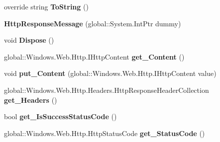 \begin{DoxyCompactItemize}
override string {\bfseries To\+String} ()
\item 
\mbox{\label{class_windows_1_1_web_1_1_http_1_1_http_response_message_abf9eacfb0122fbb37c4cefbe6027c1bb}} 
{\bfseries Http\+Response\+Message} (global\+::\+System.\+Int\+Ptr dummy)
\item 
\mbox{\label{class_windows_1_1_web_1_1_http_1_1_http_response_message_a79ea29d0bc40d8bc64102d96f59aebf4}} 
void {\bfseries Dispose} ()
\item 
\mbox{\label{class_windows_1_1_web_1_1_http_1_1_http_response_message_aa742acc5e70c1d817b438ea41be4de12}} 
global\+::\+Windows.\+Web.\+Http.\+I\+Http\+Content {\bfseries get\+\_\+\+Content} ()
\item 
\mbox{\label{class_windows_1_1_web_1_1_http_1_1_http_response_message_a3cb8022988b8e1a2586f7a102281c88c}} 
void {\bfseries put\+\_\+\+Content} (global\+::\+Windows.\+Web.\+Http.\+I\+Http\+Content value)
\item 
\mbox{\label{class_windows_1_1_web_1_1_http_1_1_http_response_message_aaca34cdc610c5bae128167860b27d451}} 
global\+::\+Windows.\+Web.\+Http.\+Headers.\+Http\+Response\+Header\+Collection {\bfseries get\+\_\+\+Headers} ()
\item 
\mbox{\label{class_windows_1_1_web_1_1_http_1_1_http_response_message_a91963a9e973727c0e5c97fcc0ead8060}} 
bool {\bfseries get\+\_\+\+Is\+Success\+Status\+Code} ()
\item 
\mbox{\label{class_windows_1_1_web_1_1_http_1_1_http_response_message_a559b5594bd74d83fdc6617968b8a0d95}} 
global\+::\+Windows.\+Web.\+Http.\+Http\+Status\+Code {\bfseries get\+\_\+\+Status\+Code} ()
\item 
\mbox{\label{class_windows_1_1_web_1_1_http_1_1_http_response_message_a41a46b8ee759bbf5b15b954f928eb816}} 

\end{DoxyCompactItemize}
